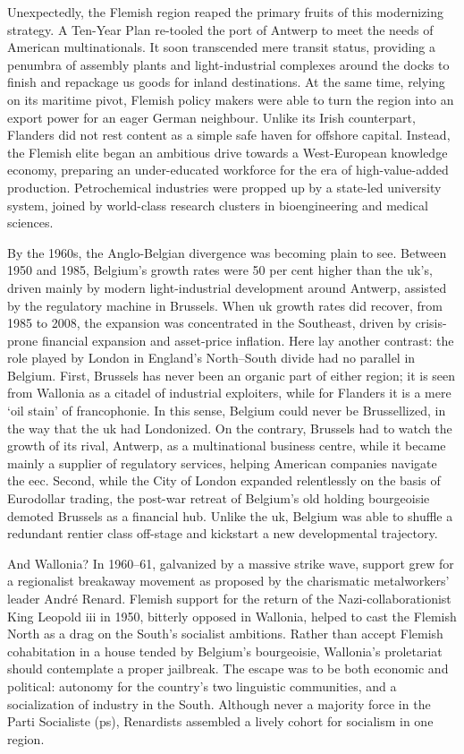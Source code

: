 \documentclass[
]{book}
\begin{document}
Unexpectedly, the Flemish region reaped the primary fruits of this modernizing strategy. A Ten-Year Plan re-tooled the port of Antwerp to meet the needs of American multinationals. It soon transcended mere transit status, providing a penumbra of assembly plants and light-industrial complexes around the docks to finish and repackage us goods for inland destinations. At the same time, relying on its maritime pivot, Flemish policy makers were able to turn the region into an export power for an eager German neighbour. Unlike its Irish counterpart, Flanders did not rest content as a simple safe haven for offshore capital. Instead, the Flemish elite began an ambitious drive towards a West-European knowledge economy, preparing an under-educated workforce for the era of high-value-added production. Petrochemical industries were propped up by a state-led university system, joined by world-class research clusters in bioengineering and medical sciences.

By the 1960s, the Anglo-Belgian divergence was becoming plain to see. Between 1950 and 1985, Belgium's growth rates were 50 per cent higher than the uk's, driven mainly by modern light-industrial development around Antwerp, assisted by the regulatory machine in Brussels. When uk growth rates did recover, from 1985 to 2008, the expansion was concentrated in the Southeast, driven by crisis-prone financial expansion and asset-price inflation. Here lay another contrast: the role played by London in England's North--South divide had no parallel in Belgium. First, Brussels has never been an organic part of either region; it is seen from Wallonia as a citadel of industrial exploiters, while for Flanders it is a mere `oil stain' of francophonie. In this sense, Belgium could never be Brussellized, in the way that the uk had Londonized. On the contrary, Brussels had to watch the growth of its rival, Antwerp, as a multinational business centre, while it became mainly a supplier of regulatory services, helping American companies navigate the eec. Second, while the City of London expanded relentlessly on the basis of Eurodollar trading, the post-war retreat of Belgium's old holding bourgeoisie demoted Brussels as a financial hub. Unlike the uk, Belgium was able to shuffle a redundant rentier class off-stage and kickstart a new developmental trajectory.

And Wallonia? In 1960--61, galvanized by a massive strike wave, support grew for a regionalist breakaway movement as proposed by the charismatic metalworkers' leader André Renard. Flemish support for the return of the Nazi-collaborationist King Leopold iii in 1950, bitterly opposed in Wallonia, helped to cast the Flemish North as a drag on the South's socialist ambitions. Rather than accept Flemish cohabitation in a house tended by Belgium's bourgeoisie, Wallonia's proletariat should contemplate a proper jailbreak. The escape was to be both economic and political: autonomy for the country's two linguistic communities, and a socialization of industry in the South. Although never a majority force in the Parti Socialiste (ps), Renardists assembled a lively cohort for socialism in one region.
\end{document}
